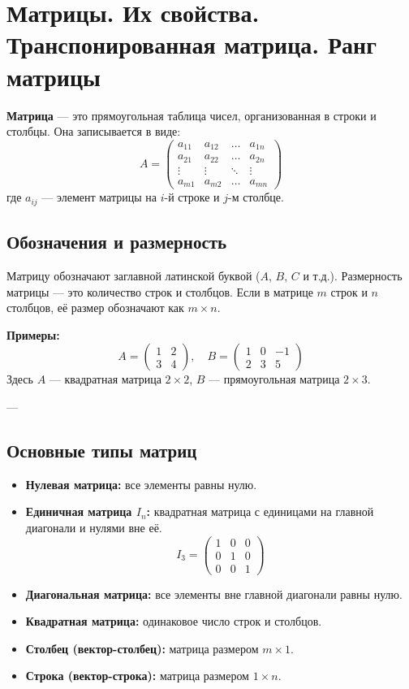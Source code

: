 \section{Матрицы. Их свойства. Транспонированная матрица. Ранг матрицы}

\textbf{Матрица} — это прямоугольная таблица чисел, организованная в строки и столбцы. Она записывается в виде:
\[
A =
\begin{pmatrix}
a_{11} & a_{12} & \dots & a_{1n} \\
a_{21} & a_{22} & \dots & a_{2n} \\
\vdots & \vdots & \ddots & \vdots \\
a_{m1} & a_{m2} & \dots & a_{mn}
\end{pmatrix}
\]
где $a_{ij}$ — элемент матрицы на $i$-й строке и $j$-м столбце.

\subsection*{Обозначения и размерность}

Матрицу обозначают заглавной латинской буквой ($A$, $B$, $C$ и т.д.). Размерность матрицы — это количество строк и столбцов. Если в матрице $m$ строк и $n$ столбцов, её размер обозначают как $m \times n$.

\textbf{Примеры:}
\[
A =
\begin{pmatrix}
1 & 2 \\
3 & 4
\end{pmatrix}, \quad
B =
\begin{pmatrix}
1 & 0 & -1 \\
2 & 3 & 5
\end{pmatrix}
\]
Здесь $A$ — квадратная матрица $2\times2$, $B$ — прямоугольная матрица $2\times3$.

---

\subsection*{Основные типы матриц}

\begin{itemize}
  \item \textbf{Нулевая матрица:} все элементы равны нулю.
  \item \textbf{Единичная матрица $I_n$:} квадратная матрица с единицами на главной диагонали и нулями вне её.
  \[
  I_3 =
  \begin{pmatrix}
  1 & 0 & 0 \\
  0 & 1 & 0 \\
  0 & 0 & 1
  \end{pmatrix}
  \]
  \item \textbf{Диагональная матрица:} все элементы вне главной диагонали равны нулю.
  \item \textbf{Квадратная матрица:} одинаковое число строк и столбцов.
  \item \textbf{Столбец (вектор-столбец):} матрица размером $m \times 1$.
  \item \textbf{Строка (вектор-строка):} матрица размером $1 \times n$.
\end{itemize}


